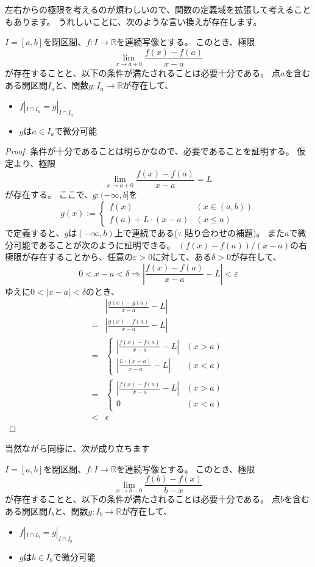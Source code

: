 左右からの極限を考えるのが煩わしいので、関数の定義域を拡張して考えることもあります。
うれしいことに、次のような言い換えが存在します。
\begin{theorem}
  $I=[a,b]$を閉区間、$f:I\to\mathbb{R}$を連続写像とする。
  このとき、極限
  \[
    \lim_{x\to a+0}\frac{f(x)-f(a)}{x-a}
  \]
  が存在することと、以下の条件が満たされることは必要十分である。
  点$a$を含むある開区間$I_a$と、関数$g:I_a\to\mathbb{R}$が存在して、
  \begin{itemize}
    \item $f|_{I\cap I_a}=g|_{I\cap I_a}$
    \item $g$は$a\in I_a$で微分可能
  \end{itemize}
\end{theorem}
\begin{proof}
  条件が十分であることは明らかなので、必要であることを証明する。
  仮定より、極限
  \[
    \lim_{x\to a+0}\frac{f(x)-f(a)}{x-a}=L
  \]
  が存在する。
  ここで、$g:(-\infty,b]$を
  \[
    g(x):=\begin{cases}
      f(x) & (x\in (a,b))\\
      f(a)+L\cdot(x-a) & (x\leq a)
    \end{cases}
  \]
  で定義すると、$g$は$(-\infty,b)$上で連続である($\because$ 貼り合わせの補題)。
  また$a$で微分可能であることが次のように証明できる。
  $(f(x)-f(a))/(x-a)$の右極限が存在することから、任意の$\varepsilon>0$に対して、ある$\delta>0$が存在して、
  \[
    0<x-a<\delta\Rightarrow\left|\frac{f(x)-f(a)}{x-a}-L\right|<\varepsilon
  \]
  ゆえに$0<|x-a|<\delta$のとき、
  \begin{align*}
    &\left|\frac{g(x)-g(a)}{x-a}-L\right|\\
    =&\left|\frac{g(x)-f(a)}{x-a}-L\right|\\
    =&\begin{cases}
      \left|\frac{f(x)-f(a)}{x-a}-L\right| & (x>a)\\
      \left|\frac{L\cdot(x-a)}{x-a}-L\right| & (x<a)
    \end{cases}\\
    =&\begin{cases}
      \left|\frac{f(x)-f(a)}{x-a}-L\right| & (x>a)\\
      0 & (x<a)
    \end{cases}\\
    <&\epsilon
  \end{align*}
\end{proof}

当然ながら同様に、次が成り立ちます
\begin{theorem}
  $I=[a,b]$を閉区間、$f:I\to\mathbb{R}$を連続写像とする。
  このとき、極限
  \[
    \lim_{x\to b-0}\frac{f(b)-f(x)}{b-x}
  \]
  が存在することと、以下の条件が満たされることは必要十分である。
  点$b$を含むある開区間$I_b$と、関数$g:I_b\to\mathbb{R}$が存在して、
  \begin{itemize}
    \item $f|_{I\cap I_b}=g|_{I\cap I_b}$
    \item $g$は$b\in I_b$で微分可能
  \end{itemize}
\end{theorem}

